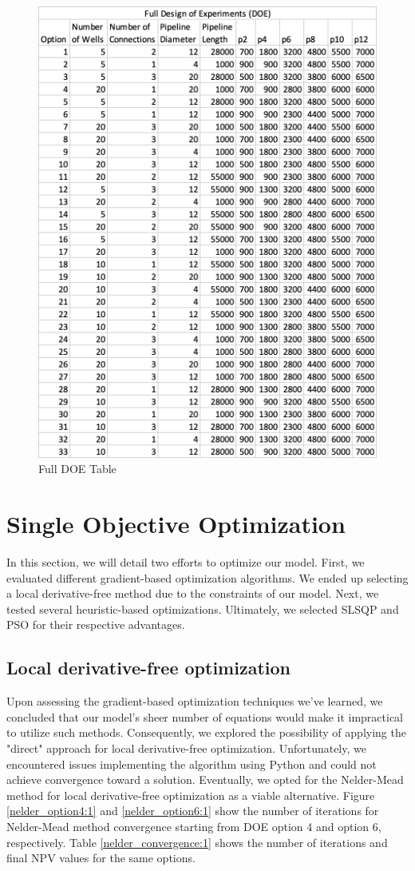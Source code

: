 \documentclass[balance,upint,subscriptcorrection,varvw,mathalfa=cal=boondoxo,spanish,french,vietnamese,russian,greek,pdf-a,colorlinks]{asmeconf}
\begin{document}
\begin{figure}
\centering\includegraphics[width=0.7\linewidth]{images/full_DOE.png}
\caption{Full DOE Table}\label{full_doe:1}
\end{figure}
 

\section{Single Objective Optimization}
In this section, we will detail two efforts to optimize our model. First, we evaluated different gradient-based optimization algorithms. We ended up selecting a local derivative-free method due to the constraints of our model. Next, we tested several heuristic-based optimizations. Ultimately, we selected SLSQP and PSO for their respective advantages.

\subsection{Local derivative-free optimization}

Upon assessing the gradient-based optimization techniques we've learned, we concluded that our model's sheer number of equations would make it impractical to utilize such methods. Consequently, we explored the possibility of applying the "direct" approach for local derivative-free optimization. Unfortunately, we encountered issues implementing the algorithm using Python and could not achieve convergence toward a solution. Eventually, we opted for the Nelder-Mead method for local derivative-free optimization as a viable alternative. Figure \ref{nelder_option4:1} and \ref{nelder_option6:1} show the number of iterations for Nelder-Mead method convergence starting from DOE option 4 and option 6, respectively. Table \ref{nelder_convergence:1} shows the number of iterations and final NPV values for the same options. 
\end{document}
